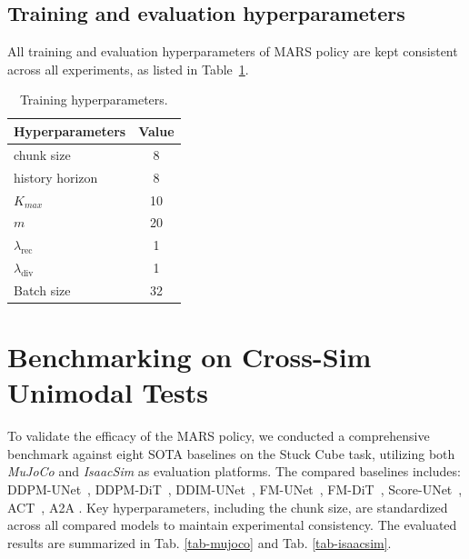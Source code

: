 \subsection{Training and evaluation hyperparameters}

All training and evaluation hyperparameters of MARS policy are kept consistent across all experiments, as listed in Table~\ref{tab:parameters}.

\renewcommand*{\thetable}{S1}
\begin{table}[ht]
  \caption{Training hyperparameters.}
  \label{tab:parameters}
  \centering
  \begin{tabular}{lc}
    \toprule
    \textbf{Hyperparameters} & \textbf{Value} \\
    \midrule
    chunk size & 8 \\
    history horizon & 8 \\
    $K_{max}$  & 10 \\
    $m$  & 20 \\
    $\lambda_{\text{rec}}$   & 1 \\
    $\lambda_{\text{div}}$   & 1 \\
    Batch size           & 32 \\
    \bottomrule
  \end{tabular}
\end{table}

\section{Benchmarking on Cross-Sim Unimodal Tests}
\label{appen:Unimodal}
To validate the efficacy of the MARS policy, we conducted a comprehensive benchmark against eight SOTA baselines on the Stuck Cube task, utilizing both \textit{MuJoCo} and \textit{IsaacSim} as evaluation platforms. 
The compared baselines includes: DDPM-UNet~\citep{dp, ddpm}, DDPM-DiT~\citep{ddpm, Peebles_2023_ICCV}, DDIM-UNet~\citep{dp, song2020denoising}, FM-UNet~\citep{flowmatching}, FM-DiT~\citep{flowmatching, Peebles_2023_ICCV}, Score-UNet~\citep{song2020score}, ACT~\citep{zhao2023learning},  A2A \citep{jia2026action}. Key hyperparameters, including the chunk size, are standardized across all compared models to maintain experimental consistency. The evaluated results are summarized in  Tab. \ref{tab-mujoco} and Tab. \ref{tab-isaacsim}.

